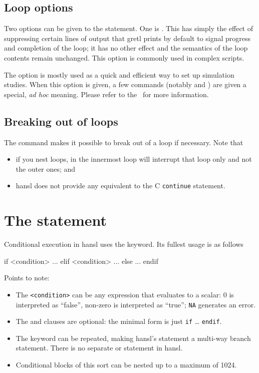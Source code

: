 \subsection{Loop options}

Two options can be given to the  statement. One is
. This has simply the effect of suppressing certain
lines of output that gretl prints by default to signal progress and
completion of the loop; it has no other effect and the semantics of
the loop contents remain unchanged. This option is commonly used in
complex scripts.

The  option is mostly used as a quick and
efficient way to set up simulation studies. When this option is given,
a few commands (notably  and ) are given a
special, \emph{ad hoc} meaning. Please refer to the \GUG\ for more
information.
 
\subsection{Breaking out of loops}
\label{sec:loop-break}

The  command makes it possible to break out of a loop if
necessary. Note that
\begin{itemize}
\item if you nest loops,  in the innermost loop will
  interrupt that loop only and not the outer ones; and
\item hansl does not provide any equivalent to the C \texttt{continue}
  statement.
\end{itemize}

\section{The  statement}

Conditional execution in hansl uses the  keyword. Its fullest
usage is as follows
\begin{code}
if <condition>
   ...
elif <condition>
   ...
else 
   ...
endif  
\end{code}

Points to note:
\begin{itemize}
\item The \texttt{<condition>} can be any expression that evaluates to a
  scalar: 0 is interpreted as ``false'', non-zero is interpreted as
  ``true''; \texttt{NA} generates an error.
\item The  and  clauses are optional: the minimal
  form is just \texttt{if} \dots{} \texttt{endif}.
\item The  keyword can be repeated, making hansl's 
  statement a multi-way branch statement. There is no separate
   or  statement in hansl.
\item Conditional blocks of this sort can be nested up to a maximum of
  1024.
\end{itemize}

